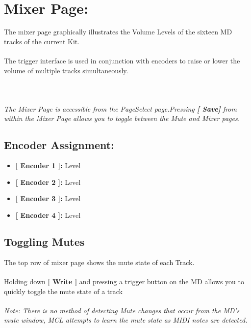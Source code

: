 \chapter{Mixer Page:}
The mixer page graphically illustrates the Volume Levels of the sixteen MD tracks of the current Kit.\\
\\
The trigger interface is used in conjunction with encoders to raise or lower the volume of multiple tracks simultaneously.\\
\\
\\\\
\textit{The Mixer Page is accessible from the PageSelect page.Pressing \textbf{[ Save] } from within the Mixer Page  allows you to toggle between the Mute and Mixer pages.}
\section{Encoder Assignment:}
\begin{itemize}
	\item \textbf{[ Encoder 1 ]: } Level
	\item \textbf{[ Encoder 2 ]: } Level
    \item \textbf{[ Encoder 3 ]: } Level
	\item \textbf{[ Encoder 4 ]: } Level
\end{itemize}


\section{Toggling Mutes}
The top row of mixer page shows the mute state of each Track. \\
\\
Holding down \textbf{[ Write ]} and pressing a trigger button on the MD allows you to quickly toggle the mute state of a track\\
\\
\textit{Note: There is no method of detecting Mute changes that occur from the MD's mute window, MCL attempts to learn the mute state as  MIDI notes are detected.}
